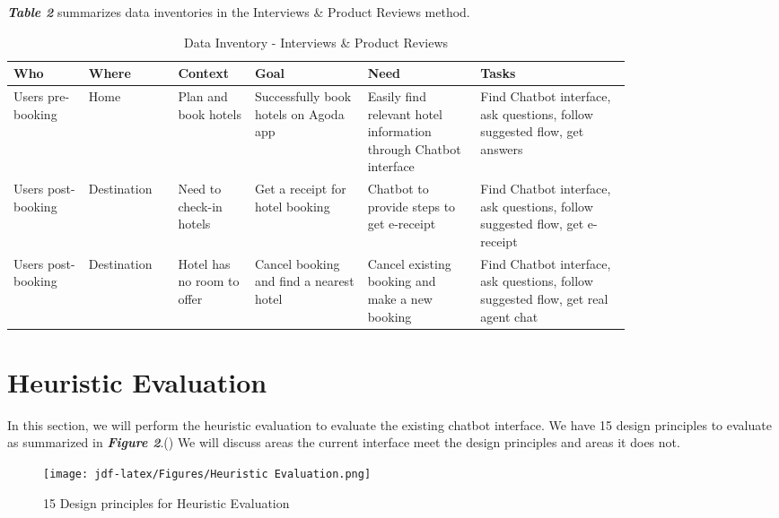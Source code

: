 \documentclass[
	letterpaper, %
]{jdf}
\begin{document}
\textit{\textbf{Table 2}} summarizes data inventories in the Interviews \& Product Reviews method.

\begin{table}[hbt!]
	\caption{Data Inventory - Interviews \& Product Reviews}
	\small %
	\centering %
	\begin{tabular}{L{0.1\linewidth} L{0.1\linewidth} L{0.1\linewidth} L{0.15\linewidth} L{0.15\linewidth} L{0.2\linewidth}}
		\textbf{Who} & \textbf{Where} & \textbf{Context} & \textbf{Goal} & \textbf{Need} & \textbf{Tasks}\\
		\toprule[0.5pt]
		Users pre-booking & Home & Plan and book hotels & Successfully book hotels on Agoda app & Easily find relevant hotel information through Chatbot interface & Find Chatbot interface, ask questions, follow suggested flow, get answers \\
		\midrule
		Users post-booking & Destination & Need to check-in hotels & Get a receipt for hotel booking & Chatbot to provide steps to get e-receipt & Find Chatbot interface, ask questions, follow suggested flow, get e-receipt \\
		\midrule
		Users post-booking & Destination & Hotel has no room to offer & Cancel booking and find a nearest hotel & Cancel existing booking and make a new booking & Find Chatbot interface, ask questions, follow suggested flow, get real agent chat \\
	\end{tabular}
\end{table}
\clearpage

\section{Heuristic Evaluation}
In this section, we will perform the heuristic evaluation to evaluate the existing chatbot interface. We have 15 design principles to evaluate as summarized in \textit{\textbf{Figure 2}}.(\cite{joyner2016e}) We will discuss areas the current interface meet the design principles and areas it does not.
\begin{figure}[hbt!]
	\centering
	\texttt{[image: jdf-latex/Figures/Heuristic Evaluation.png]}
	\caption{15 Design principles for Heuristic Evaluation}
	\label{fig:wizard}
\end{figure}
\end{document}
